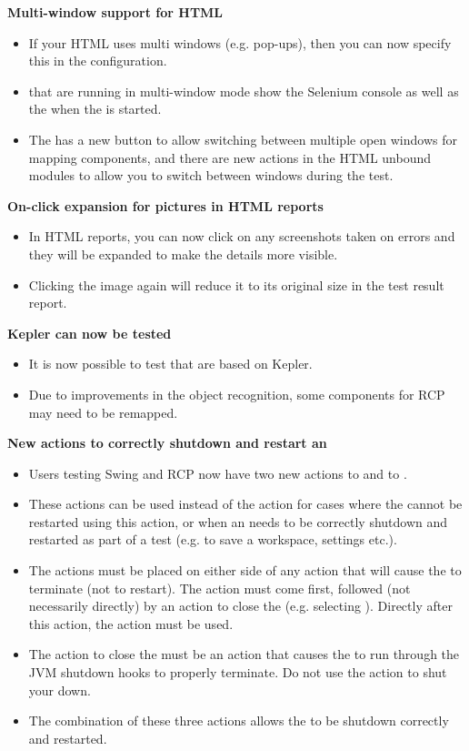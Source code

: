 \textbf{Multi-window support for HTML \gdauts{}}
\begin{itemize}
\item If your HTML \gdaut{} uses multi windows (e.g. pop-ups), then you can now specify this in the \gdaut{} configuration. 
\item \gdauts{} that are running in multi-window mode show the Selenium console as well as the \gdaut{} when the \gdaut{} is started. 
\item The \gdomeditor{} has a new button to allow switching between multiple open windows for mapping components, and there are new actions in the HTML unbound modules to allow you to switch between windows during the test. 
\end{itemize}

\textbf{On-click expansion for pictures in HTML reports}
\begin{itemize}
\item In HTML reports, you can now click on any screenshots taken on errors and they will be expanded to make the details more visible.
\item Clicking the image again will reduce it to its original size in the test result report.
\end{itemize}

\textbf{Kepler \gdauts{} can now be tested}
\begin{itemize}
\item It is now possible to test \gdauts{} that are based on Kepler.
\item Due to improvements in the object recognition, some components for RCP \gdauts{} may need to be remapped.
\end{itemize}

\textbf{New actions to correctly shutdown and restart an \gdaut{}}
\begin{itemize}
\item Users testing Swing and RCP \gdauts{} now have two new actions to  and to . 
\item These actions can be used instead of the  action for cases where the \gdaut{} cannot be restarted using this action, or when an \gdaut{} needs to be correctly shutdown and restarted as part of a test (e.g. to save a workspace, settings etc.).
\item The actions must be placed on either side of any action that will cause the \gdaut{} to terminate (not to restart). The  action must come first, followed (not necessarily directly) by an action to close the \gdaut{} (e.g. selecting ). Directly after this action, the  action must be used.
\item The action to close the \gdaut{} must be an action that causes the \gdaut{} to run through the JVM shutdown hooks to properly terminate. Do not use the  action to shut your \gdaut{} down.
\item The combination of these three actions allows the \gdaut{} to be shutdown correctly and restarted. 
\end{itemize}
